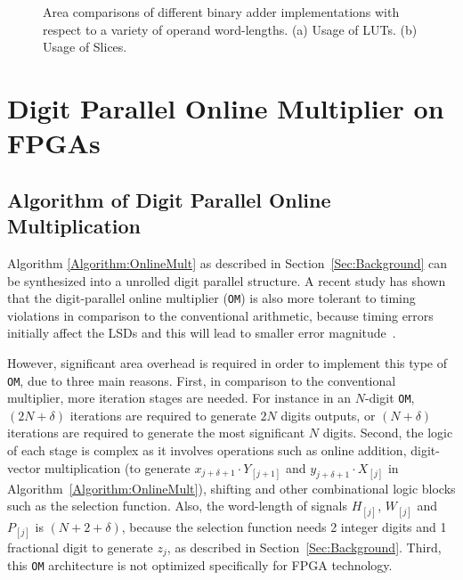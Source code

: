 \documentclass[conference]{IEEEtran}
\begin{document}
\begin{figure}[tbp]
{\begin{minipage}{0.45\textwidth}
    \vspace{1ex}
  \end{minipage}
  }
  \caption{Area comparisons of different binary adder implementations with respect to a variety of operand word-lengths. (a) Usage of LUTs. (b) Usage of Slices.}
  \label{Fig:AdderArea}
  \vspace{-1ex}
\end{figure}






\section{Digit Parallel Online Multiplier on FPGAs}\label{Sec:OM_FPGA}
\subsection{Algorithm of Digit Parallel Online Multiplication}
Algorithm \ref{Algorithm:OnlineMult} as described in Section~\ref{Sec:Background} can be synthesized into a unrolled digit parallel structure. A recent study has shown that the digit-parallel online multiplier (\texttt{OM}) is also more tolerant to timing violations in comparison to the conventional arithmetic, because timing errors initially affect the LSDs and this will lead to smaller error magnitude~\cite{SKDAC14_REVIEW}. %

However, significant area overhead is required in order to implement this type of \texttt{OM}, due to three main reasons. First, in comparison to the conventional multiplier, more iteration stages are needed. For instance in an $N$-digit \texttt{OM}, $(2N+\delta)$ iterations are required to generate $2N$ digits outputs, or $(N+\delta)$ iterations are required to generate the most significant $N$ digits. Second, the logic of each stage is complex as it involves operations such as online addition, digit-vector multiplication (to generate $x_{j+\delta+1}\cdot Y_{[j+1]}$ and $y_{j+\delta+1}\cdot X_{[j]}$ in Algorithm~\ref{Algorithm:OnlineMult}), shifting and other combinational logic blocks such as the selection function. Also, the word-length of signals $H_{[j]}$, $W_{[j]}$ and $P_{[j]}$ is $(N+2+\delta)$, because the selection function needs 2 integer digits and 1 fractional digit to generate $z_j$, as described in Section~\ref{Sec:Background}. Third, this \texttt{OM} architecture is not optimized specifically for FPGA technology.
\end{document}
